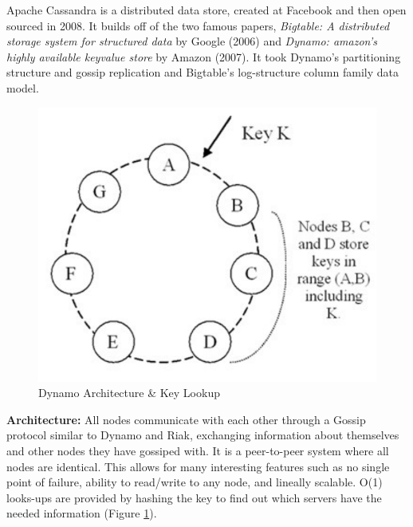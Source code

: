 \documentclass[9pt]{extarticle} %
\begin{document}
\begin{minipage}[t]{.61\linewidth} %
\vspace{-0.4cm}
\hypertarget{firstnews}{} 

Apache Cassandra is a distributed data store, created at Facebook and then open sourced in 2008. It builds off of the two famous papers, \textit{Bigtable: A distributed storage system for structured data} by Google (2006) and \textit{Dynamo: amazon's highly available keyvalue store} by Amazon (2007). It took Dynamo's partitioning structure and gossip replication and Bigtable's log-structure column family data model.

\begin{figure}
\includegraphics[width=\linewidth]{imgs/dynamo.png} 
\caption{Dynamo Architecture \& Key Lookup}\label{fig:1}
\end{figure} 

\textbf{Architecture:} All nodes communicate with each other through a Gossip protocol similar to Dynamo and Riak, exchanging information about themselves and other nodes they have gossiped with. It is a peer-to-peer system where all nodes are identical. This allows for many interesting features such as no single point of failure, ability to read/write to any node, and lineally scalable. O(1) looks-ups are provided by hashing the key to find out which servers have the needed information (Figure \ref{fig:1}).


\end{minipage}
\end{document}
